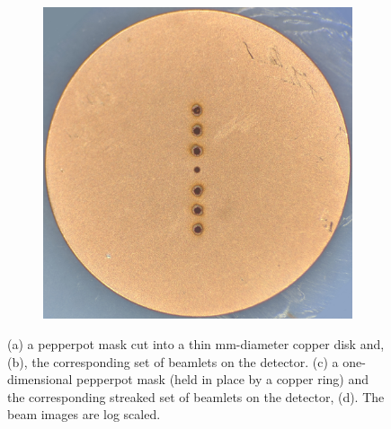 \begin{figure}
    \begin{subfigure}{0.49\linewidth}
    \centering
    \includegraphics[width=\linewidth]{part2/Figs/example_pepperpot_1d.jpg}
    \caption{}
    \label{figure:1d_pepperpot}
    \end{subfigure}
    \begin{subfigure}{0.49\linewidth}
    \centering
    
    \caption{}
    \label{figure:streaked_1d_pepperpot}
    \end{subfigure}
    \caption[One- and two-dimensional pepperpot masks.]{(a) a pepperpot mask cut into a thin \unit[3]{mm}-diameter copper disk and, (b), the corresponding set of beamlets on the detector. (c) a one-dimensional pepperpot mask (held in place by a copper ring) and the corresponding streaked set of beamlets on the detector, (d). The beam images are log scaled.}
    \label{figure:pepperpot_example}
\end{figure}

